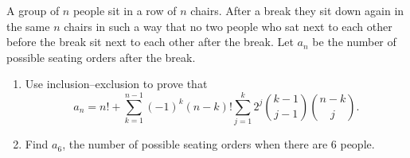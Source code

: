 A group of $n$ people sit in a row of $n$ chairs. After a break they sit down again in the same $n$ chairs in such a way that no two people who sat next to each other before the break sit next to each other after the break. Let $a_n$ be the number of possible seating orders after the break.
\begin{enumerate}
\item[(a)] Use inclusion--exclusion to prove that
\[a_n=n!+\sum_{k=1}^{n-1}(-1)^k(n-k)!\sum_{j=1}^{k}2^j\binom{k-1}{j-1}\binom{n-k}{j}.\]
\item[(b)] Find $a_6$, the number of possible seating orders when there are $6$ people.
\end{enumerate}

